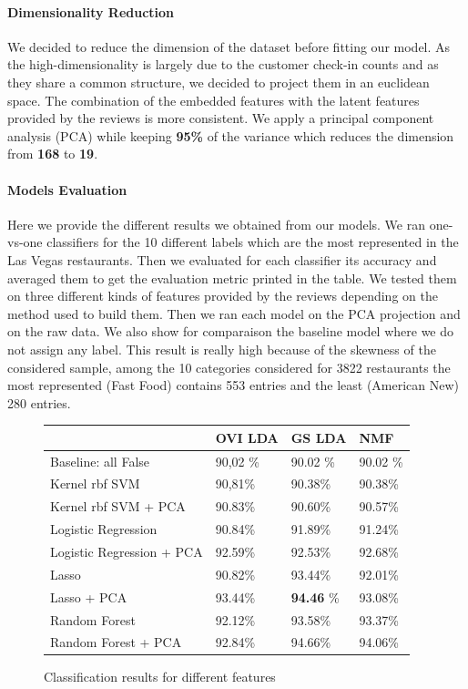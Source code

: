 \documentclass[twoside]{article}
\begin{document}
\begin{multicols}{2}
\paragraph{Dimensionality Reduction}

\noindent We decided to reduce the dimension of the dataset before fitting our model. As the high-dimensionality is largely due to the customer check-in counts and as they share a common structure, we decided to project them in an euclidean space. The combination of the embedded features with the latent features provided by the reviews is more consistent. We apply a principal component analysis (PCA) while keeping \textbf{95\%} of the variance which reduces the dimension from \textbf{168} to \textbf{19}.

\paragraph{Models Evaluation}

\noindent Here we provide the different results we obtained from our models. We ran one-vs-one classifiers for the 10 different labels which are the most represented in the Las Vegas restaurants. Then we evaluated for each classifier its accuracy and averaged them to get the evaluation metric printed in the table. We tested them on three different kinds of features provided by the reviews depending on the method used to build them. Then we ran each model on the PCA projection and on the raw data. We also show for comparaison the baseline model where we do not assign any label. This result is really high because of the skewness of the considered sample, among the 10 categories considered for 3822 restaurants the most represented (Fast Food) contains 553 entries and the least (American New) 280 entries.

\begin{figure}[H]
\begin{center}
    \begin{tabular}{| l | l | l | l |}
    \hline
    & OVI LDA & GS LDA & NMF \\ \hline
    Baseline: all False & 90,02 \% &  90.02 \% &  90.02 \% \\ \hline
    Kernel rbf SVM & 90,81\% &  90.38\% &  90.38\% \\ \hline
    Kernel rbf SVM + PCA & 90.83\% &  90.60\% &  90.57\% \\ \hline
    Logistic Regression & 90.84\% &  91.89\%  &  91.24\%\\ \hline
    Logistic Regression + PCA & 92.59\% &  92.53\% &  92.68\% \\ \hline
    Lasso & 90.82\% &  93.44\% &  92.01\% \\ \hline
	Lasso + PCA & 93.44\%  &  \textbf{94.46} \%  &  93.08\% \\ \hline
    Random Forest & 92.12\% &  93.58\% &  93.37\% \\ \hline
    Random Forest + PCA & 92.84\% &  94.66\% &  94.06\% \\ \hline
    \end{tabular}
\end{center}
\caption{Classification results for different features}
\end{figure}


\end{multicols}
\end{document}
